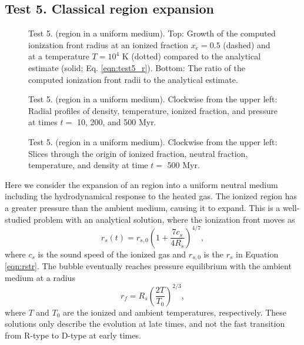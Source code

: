 \documentclass[useAMS,usenatbib,a4paper]{mn2e}
\begin{document}
\subsection{Test 5. Classical \hii region expansion}
\label{sec:test5}

\begin{figure}
  \caption{\label{fig:test5_1} Test 5. (\hii region in a uniform
    medium).  Top: Growth of the computed ionization front radius at
    an ionized fraction $x_e = 0.5$ (dashed) and at a temperature $T =
    10^4$ K (dotted) compared to the analytical estimate (solid;
    Eq. \ref{eqn:test5_r}).  Bottom: The ratio of the computed
    ionization front radii to the analytical estimate.} 
\end{figure}

\begin{figure}
  \caption{\label{fig:test5_2} Test 5. (\hii region in a uniform
    medium).  Clockwise from the upper left: Radial profiles of
    density, temperature, ionized fraction, and pressure at times $t
    =$ 10, 200, and 500 Myr.}
\end{figure}

\begin{figure*}
  \caption{\label{fig:test5_3} Test 5. (\hii region in a uniform
    medium).  Clockwise from the upper left: Slices through the origin
    of ionized fraction, neutral fraction, temperature, and density at
    time $t =$ 500 Myr.}
\end{figure*}

Here we consider the expansion of an \hii region into a uniform
neutral medium including the hydrodynamical response to the heated
gas.  The ionized region has a greater pressure than the ambient
medium, causing it to expand.  This is a well-studied problem
\citep{Spitzer78} with an analytical solution, where the ionization
front moves as
%
\begin{equation}
  \label{eqn:test5_r}
  r_s(t) = r_{s,0} \left(1 + \frac{7c_s}{4R_s}\right)^{4/7},
\end{equation}
where $c_s$ is the sound speed of the ionized gas and $r_{s,0}$ is the
$r_s$ in Equation \ref{eqn:rstr}.  The bubble eventually reaches
pressure equilibrium with the ambient medium at a radius
%
\begin{equation}
  \label{eqn:test5_final}
  r_f = R_s \left(\frac{2T}{T_0}\right)^{2/3},
\end{equation}
where $T$ and $T_0$ are the ionized and ambient temperatures,
respectively.  These solutions only describe the evolution at late
times, and not the fast transition from R-type to D-type at early
times.
\end{document}
